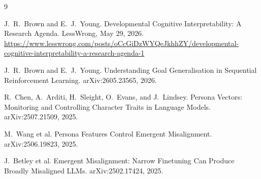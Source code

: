 \documentclass[11pt]{article}
\begin{document}
\begin{thebibliography}{9}

J.~R.~Brown and E.~J.~Young.
\newblock Developmental Cognitive Interpretability: A Research Agenda.
\newblock LessWrong, May 29, 2026.
\newblock \url{https://www.lesswrong.com/posts/oCcGiDzWYQeJkhhZY/developmental-cognitive-interpretability-a-research-agenda-1}

J.~R.~Brown and E.~J.~Young.
\newblock Understanding Goal Generalisation in Sequential Reinforcement Learning.
\newblock arXiv:2605.23565, 2026.

R.~Chen, A.~Arditi, H.~Sleight, O.~Evans, and J.~Lindsey.
\newblock Persona Vectors: Monitoring and Controlling Character Traits in Language Models.
\newblock arXiv:2507.21509, 2025.

M.~Wang et al.
\newblock Persona Features Control Emergent Misalignment.
\newblock arXiv:2506.19823, 2025.

J.~Betley et al.
\newblock Emergent Misalignment: Narrow Finetuning Can Produce Broadly Misaligned LLMs.
\newblock arXiv:2502.17424, 2025.

\end{thebibliography}
\end{document}
